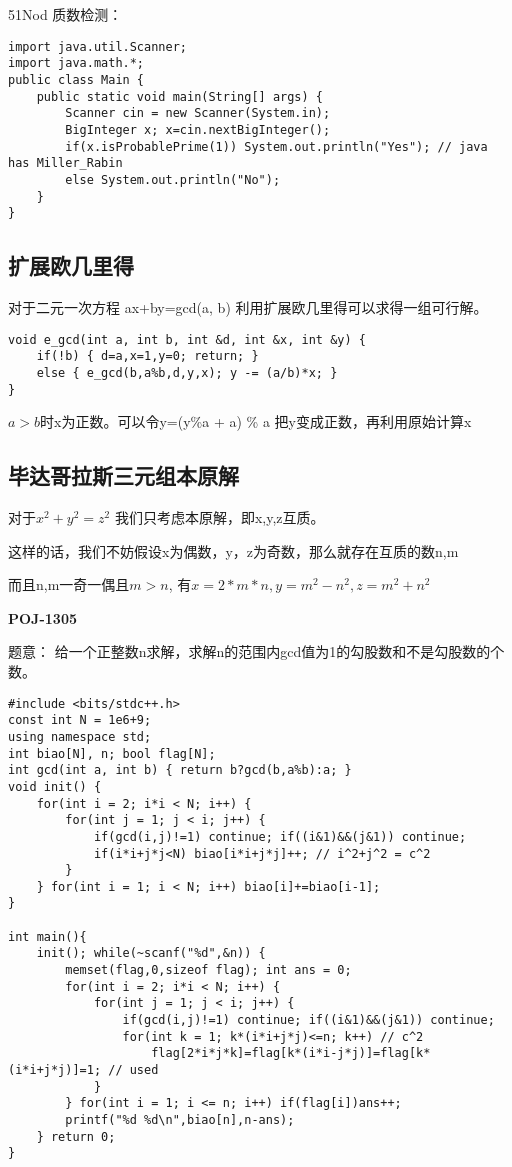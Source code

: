 51Nod 质数检测：

\begin{lstlisting}
import java.util.Scanner;
import java.math.*;
public class Main {
	public static void main(String[] args) {
		Scanner cin = new Scanner(System.in);
		BigInteger x; x=cin.nextBigInteger();
		if(x.isProbablePrime(1)) System.out.println("Yes"); // java has Miller_Rabin
		else System.out.println("No");
	}
}
\end{lstlisting}

\subsection{扩展欧几里得}
对于二元一次方程 ax+by=gcd(a, b) 利用扩展欧几里得可以求得一组可行解。


\begin{lstlisting}
void e_gcd(int a, int b, int &d, int &x, int &y) {
    if(!b) { d=a,x=1,y=0; return; }
    else { e_gcd(b,a%b,d,y,x); y -= (a/b)*x; }
}
\end{lstlisting}
$a>b$时x为正数。可以令y=(y\%a + a) \% a 把y变成正数，再利用原始计算x

\subsection{毕达哥拉斯三元组本原解}
对于$x^2 + y ^2 = z^2$ 我们只考虑本原解，即x,y,z互质。

这样的话，我们不妨假设x为偶数，y，z为奇数，那么就存在互质的数n,m

而且n,m一奇一偶且$m>n$,  有$x=2 * m * n, y  = m^2 - n ^ 2 , z= m^2 + n^2$

{\bfseries POJ-1305}

题意： 给一个正整数n求解，求解n的范围内gcd值为1的勾股数和不是勾股数的个数。

\begin{lstlisting}
#include <bits/stdc++.h>
const int N = 1e6+9;
using namespace std;
int biao[N], n; bool flag[N];
int gcd(int a, int b) { return b?gcd(b,a%b):a; }
void init() {
    for(int i = 2; i*i < N; i++) {
        for(int j = 1; j < i; j++) {
            if(gcd(i,j)!=1) continue; if((i&1)&&(j&1)) continue;
            if(i*i+j*j<N) biao[i*i+j*j]++; // i^2+j^2 = c^2
        }
    } for(int i = 1; i < N; i++) biao[i]+=biao[i-1];
}

int main(){
    init(); while(~scanf("%d",&n)) {
        memset(flag,0,sizeof flag); int ans = 0;
        for(int i = 2; i*i < N; i++) {
            for(int j = 1; j < i; j++) {
                if(gcd(i,j)!=1) continue; if((i&1)&&(j&1)) continue;
                for(int k = 1; k*(i*i+j*j)<=n; k++) // c^2
                    flag[2*i*j*k]=flag[k*(i*i-j*j)]=flag[k*(i*i+j*j)]=1; // used
            }
        } for(int i = 1; i <= n; i++) if(flag[i])ans++;
        printf("%d %d\n",biao[n],n-ans); 
    } return 0;
}
\end{lstlisting}

